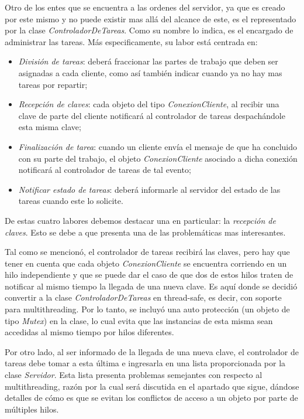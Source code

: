 \documentclass{article}
\begin{document}
	Otro de los entes que se encuentra a las ordenes del servidor, ya que es creado por este mismo y no puede existir mas allá del alcance de este, es el representado por la clase \textit{ControladorDeTareas}. Como su nombre lo indica, es el encargado de administrar las tareas. Más especificamente, su labor está centrada en:
	\medskip

	\begin{itemize}
		\itemsep=3pt \topsep=0pt \partopsep=0pt \parskip=5pt \parsep=0pt

		\item \textit{División de tareas}: deberá fraccionar las partes de trabajo que deben ser asignadas a cada cliente, como así también indicar cuando ya no hay mas tareas por repartir;

		\item \textit{Recepción de claves}: cada objeto del tipo \textit{ConexionCliente}, al recibir una clave de parte del cliente notificará al controlador de tareas despachándole esta misma clave;

		\item \textit{Finalización de tarea}: cuando un cliente envía el mensaje de que ha concluido con su parte del trabajo, el objeto \textit{ConexionCliente} asociado a dicha conexión notificará al controlador de tareas de tal evento;

		\item \textit{Notificar estado de tareas}: deberá informarle al servidor del estado de las tareas cuando este lo solicite.

	\end{itemize}
	\bigskip


	De estas cuatro labores debemos destacar una en particular: la \textit{recepción de claves}. Esto se debe a que presenta una de las problemáticas mas interesantes. 
	\par
	Tal como se mencionó, el controlador de tareas recibirá las claves, pero hay que tener en cuenta que cada objeto \textit{ConexionCliente} se encuentra corriendo en un hilo independiente y que se puede dar el caso de que dos de estos hilos traten de notificar al mismo tiempo la llegada de una nueva clave. Es aquí donde se decidió convertir a la clase \textit{ControladorDeTareas} en thread-safe, es decir, con soporte para multithreading. Por lo tanto, se incluyó una auto protección (un objeto de tipo \textit{Mutex}) en la clase, lo cual evita que las instancias de esta misma sean accedidas al mismo tiempo por hilos diferentes.
	\par
	Por otro lado, al ser informado de la llegada de una nueva clave, el controlador de tareas debe tomar a esta última e ingresarla en una lista proporcionada por la clase \textit{Servidor}. Esta lista presenta problemas semejantes con respecto al multithreading, razón por la cual será discutida en el apartado que sigue, dándose detalles de cómo es que se evitan los conflictos de acceso a un objeto por parte de múltiples hilos.
	\bigskip\smallskip
\end{document}
